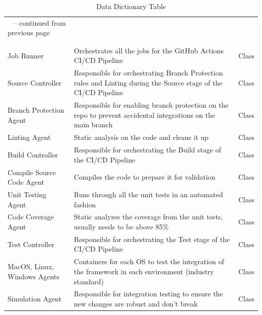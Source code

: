 \documentclass[12pt]{article}
\begin{document}
\begin{xltabular}{\textwidth}{   
  | >{\raggedright\arraybackslash}X 
  | >{\raggedright\arraybackslash}X 
  | >{\raggedright\arraybackslash}X | }
  \caption{Data Dictionary Table} \\
  
  \hline {} &  &  \\ \hline 
  \endfirsthead
  
  {\tablename\ \thetable{} -- continued from previous page} \\
  \hline {} &  &  \\ \hline 
  \endhead
  
  \hline {} \\ \hline
  \endfoot
  \hline
\endlastfoot
\hline
Job Runner & Orchestrates all the jobs for the GitHub Actions CI/CD Pipeline & Class \\
\hline
Source Controller & Responsible for orchestrating Branch Protection rules and Linting during the Source stage of the CI/CD Pipeline & Class \\
\hline
Branch Protection Agent & Responsible for enabling branch protection on the repo to prevent accidental integrations on the main branch & Class \\
\hline
Linting Agent & Static analysis on the code and cleans it up & Class \\
\hline
Build Controller & Responsible for orchestrating the Build stage of the CI/CD Pipeline & Class \\
\hline
Compile Source Code Agent & Compiles the code to prepare it for validation & Class \\
\hline
Unit Testing Agent & Runs through all the unit tests in an automated fashion & Class \\
\hline
Code Coverage Agent & Static analyzes the coverage from the unit tests, usually needs to be above 85\% & Class \\
\hline
Test Controller & Responsible for orchestrating the Test stage of the CI/CD Pipeline & Class \\
\hline
MacOS, Linux, Windows Agents & Containers for each OS to test the integration of the framework in each environment (industry standard) & Class \\
\hline
Simulation Agent & Responsible for integration testing to ensure the new changes are robust and don’t break & Class \\

\end{xltabular}
\end{document}
